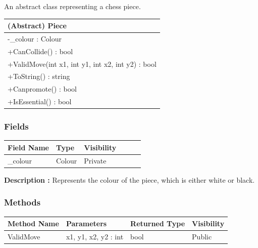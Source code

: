 \documentclass[12pt]{article}
\begin{document}
    An abstract class representing a chess piece.
\begin{table}[H]
    \begin{tabular}{|l|}
    \hline
    \cellcolor[HTML]{C0C0C0}\textbf{(Abstract) Piece}  \\ \hline
    \cellcolor[HTML]{EFEFEF}-\_colour : Colour         \\ \hline
    +CanCollide() : bool                               \\ \hline
    +ValidMove(int x1, int y1, int x2, int y2) : bool  \\ \hline
    +ToString() : string                               \\ \hline
    +Canpromote() : bool                               \\ \hline
    +IsEssential() : bool                              \\ \hline
    \end{tabular}
\end{table}

\subsubsection{Fields}

\begin{table}[H]
    \begin{tabular}{llllll}
    \hline
    \multicolumn{1}{|l|}{\cellcolor[HTML]{EFEFEF}\textbf{Field Name}} & \multicolumn{1}{l|}{\cellcolor[HTML]{EFEFEF}\textbf{Type}} & \multicolumn{1}{l|}{\cellcolor[HTML]{EFEFEF}\textbf{Visibility}} \\ \hline
    \multicolumn{1}{|l|}{\_colour}                                    & \multicolumn{1}{l|}{Colour}                                & \multicolumn{1}{l|}{Private}                                     \\ \hline
    \end{tabular}
\end{table}

    \textbf{Description :} Represents the colour of the piece, which is either white or black.

\subsubsection{Methods}

\begin{table}[H]
    \begin{tabular}{|l|l|l|l|}
    \hline
    \rowcolor[HTML]{EFEFEF} 
    \cellcolor[HTML]{EFEFEF}\textbf{Method Name} & \textbf{Parameters}  & \textbf{Returned Type} & \textbf{Visibility} \\ \hline
    ValidMove                          & x1, y1, x2, y2 : int & bool                   & Public              \\ \hline
    \end{tabular}
\end{table}
\end{document}
